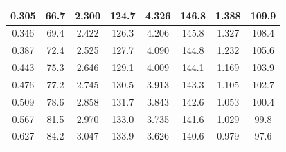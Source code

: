 \documentclass[a4paper,12pt,titlepage]{article}
\begin{document}
\begin{table}[]
\begin{tabular}{|cccccccc}
\multicolumn{1}{|c|}{0.305}       & \multicolumn{1}{c|}{66.7}               & \multicolumn{1}{c|}{2.300}       & \multicolumn{1}{c|}{124.7}              & \multicolumn{1}{c|}{4.326}       & \multicolumn{1}{c|}{146.8}              & \multicolumn{1}{c|}{1.388}       & \multicolumn{1}{c|}{109.9}              \\ \hline
\multicolumn{1}{|c|}{0.346}       & \multicolumn{1}{c|}{69.4}               & \multicolumn{1}{c|}{2.422}       & \multicolumn{1}{c|}{126.3}              & \multicolumn{1}{c|}{4.206}       & \multicolumn{1}{c|}{145.8}              & \multicolumn{1}{c|}{1.327}       & \multicolumn{1}{c|}{108.4}              \\ \hline
\multicolumn{1}{|c|}{0.387}       & \multicolumn{1}{c|}{72.4}               & \multicolumn{1}{c|}{2.525}       & \multicolumn{1}{c|}{127.7}              & \multicolumn{1}{c|}{4.090}       & \multicolumn{1}{c|}{144.8}              & \multicolumn{1}{c|}{1.232}       & \multicolumn{1}{c|}{105.6}              \\ \hline
\multicolumn{1}{|c|}{0.443}       & \multicolumn{1}{c|}{75.3}               & \multicolumn{1}{c|}{2.646}       & \multicolumn{1}{c|}{129.1}              & \multicolumn{1}{c|}{4.009}       & \multicolumn{1}{c|}{144.1}              & \multicolumn{1}{c|}{1.169}       & \multicolumn{1}{c|}{103.9}              \\ \hline
\multicolumn{1}{|c|}{0.476}       & \multicolumn{1}{c|}{77.2}               & \multicolumn{1}{c|}{2.745}       & \multicolumn{1}{c|}{130.5}              & \multicolumn{1}{c|}{3.913}       & \multicolumn{1}{c|}{143.3}              & \multicolumn{1}{c|}{1.105}       & \multicolumn{1}{c|}{102.7}              \\ \hline
\multicolumn{1}{|c|}{0.509}       & \multicolumn{1}{c|}{78.6}               & \multicolumn{1}{c|}{2.858}       & \multicolumn{1}{c|}{131.7}              & \multicolumn{1}{c|}{3.843}       & \multicolumn{1}{c|}{142.6}              & \multicolumn{1}{c|}{1.053}       & \multicolumn{1}{c|}{100.4}              \\ \hline
\multicolumn{1}{|c|}{0.567}       & \multicolumn{1}{c|}{81.5}               & \multicolumn{1}{c|}{2.970}       & \multicolumn{1}{c|}{133.0}              & \multicolumn{1}{c|}{3.735}       & \multicolumn{1}{c|}{141.6}              & \multicolumn{1}{c|}{1.029}       & \multicolumn{1}{c|}{99.8}               \\ \hline
\multicolumn{1}{|c|}{0.627}       & \multicolumn{1}{c|}{84.2}               & \multicolumn{1}{c|}{3.047}       & \multicolumn{1}{c|}{133.9}              & \multicolumn{1}{c|}{3.626}       & \multicolumn{1}{c|}{140.6}              & \multicolumn{1}{c|}{0.979}       & \multicolumn{1}{c|}{97.6}               \\ \hline

\end{tabular}
\end{table}
\end{document}
